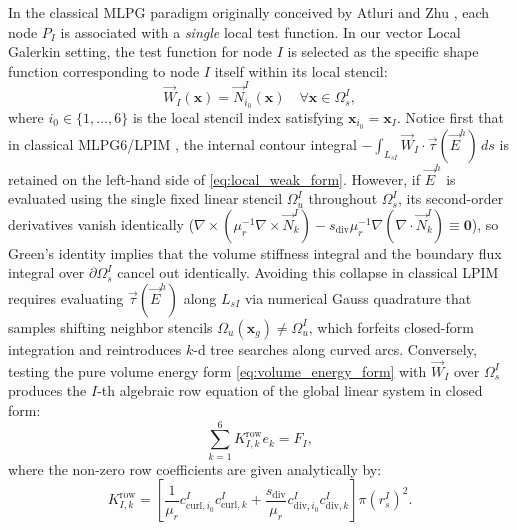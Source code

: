 \documentclass[preprint,12pt]{elsarticle}
\begin{document}
In the classical MLPG paradigm originally conceived by Atluri and Zhu \cite{atluri1998new, atluri2002meshless}, each node $P_I$ is associated with a \textit{single} local test function. In our vector Local Galerkin setting, the test function for node $I$ is selected as the specific shape function corresponding to node $I$ itself within its local stencil:
\begin{equation}
    \vec{W}_I(\mathbf{x}) = \vec{N}_{i_0}^I(\mathbf{x}) \quad \forall \mathbf{x} \in \Omega_s^I,
    \label{eq:test_function_row}
\end{equation}
where $i_0 \in \{1, \dots, 6\}$ is the local stencil index satisfying $\mathbf{x}_{i_0} = \mathbf{x}_I$. Notice first that in classical MLPG6/LPIM \cite{atluri2002meshless, liu2001local}, the internal contour integral $-\int_{L_{sI}} \vec{W}_I \cdot \vec{\tau}(\vec{E}^h) \, ds$ is retained on the left-hand side of \eqref{eq:local_weak_form}. However, if $\vec{E}^h$ is evaluated using the single fixed linear stencil $\Omega_u^I$ throughout $\Omega_s^I$, its second-order derivatives vanish identically ($\nabla \times (\mu_r^{-1}\nabla \times \vec{N}_k^I) - s_{\mathrm{div}}\mu_r^{-1}\nabla(\nabla \cdot \vec{N}_k^I) \equiv \mathbf{0}$), so Green's identity implies that the volume stiffness integral and the boundary flux integral over $\partial\Omega_s^I$ cancel out identically. Avoiding this collapse in classical LPIM requires evaluating $\vec{\tau}(\vec{E}^h)$ along $L_{sI}$ via numerical Gauss quadrature that samples shifting neighbor stencils $\Omega_u(\mathbf{x}_g) \ne \Omega_u^I$, which forfeits closed-form integration and reintroduces $k$-d tree searches along curved arcs. Conversely, testing the pure volume energy form \eqref{eq:volume_energy_form} with $\vec{W}_I$ over $\Omega_s^I$ produces the $I$-th algebraic row equation of the global linear system in closed form:
\begin{equation}
    \sum_{k=1}^6 K_{I, k}^{\mathrm{row}} e_k = F_I,
\end{equation}
where the non-zero row coefficients are given analytically by:
\begin{equation}
    K_{I, k}^{\mathrm{row}} = \left[ \frac{1}{\mu_r} c_{\mathrm{curl}, i_0}^I c_{\mathrm{curl}, k}^I + \frac{s_{\mathrm{div}}}{\mu_r} c_{\mathrm{div}, i_0}^I c_{\mathrm{div}, k}^I \right] \pi (r_s^I)^2.
    \label{eq:k_row_analytic}
\end{equation}
\end{document}
